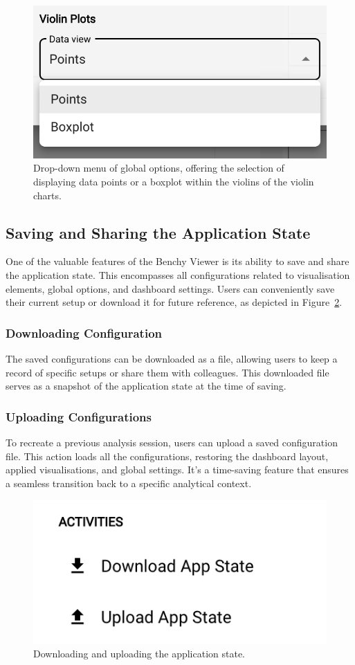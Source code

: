\begin{figure}[h]
  \centering
  \includegraphics[width=0.4\linewidth]{figures/chart-configuration-violin.png}
  \caption{Drop-down menu of global options, offering the selection of displaying data points or a boxplot within the violins of the violin charts.}
  \label{fig:chart-configuration-violin}
\end{figure}

\subsection{Saving and Sharing the Application State}\label{sec:saving-sharing-state}

One of the valuable features of the Benchy Viewer is its ability to save and share the application state. This encompasses all configurations related to visualisation elements, global options, and dashboard settings. Users can conveniently save their current setup or download it for future reference, as depicted in Figure~\ref{fig:save-upload}.

\subsubsection{Downloading Configuration}
The saved configurations can be downloaded as a file, allowing users to keep a record of specific setups or share them with colleagues. This downloaded file serves as a snapshot of the application state at the time of saving.

\subsubsection{Uploading Configurations}
To recreate a previous analysis session, users can upload a saved configuration file. This action loads all the configurations, restoring the dashboard layout, applied visualisations, and global settings. It's a time-saving feature that ensures a seamless transition back to a specific analytical context.


\begin{figure}[h]
  \vspace{0.5cm}
  \centering
  \includegraphics[width=0.4\linewidth]{figures/save-upload.png}
  \caption{Downloading and uploading the application state.}
  \label{fig:save-upload}
\end{figure}


